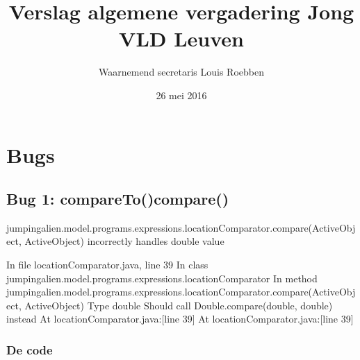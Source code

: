 \documentclass[a4paper]{article}
\begin{document}
	\title{Verslag algemene vergadering Jong VLD Leuven}
	\author{Waarnemend secretaris Louis Roebben}
	\date{26 mei 2016}
\maketitle
\section{Bugs}
\subsection{Bug 1: compareTo()compare()}
jumpingalien.model.programs.expressions.locationComparator.compare(ActiveObject, ActiveObject) incorrectly handles double value


In file locationComparator.java, line 39
In class jumpingalien.model.programs.expressions.locationComparator
In method jumpingalien.model.programs.expressions.locationComparator.compare(ActiveObject, ActiveObject)
Type double
Should call Double.compare(double, double) instead
At locationComparator.java:[line 39]
At locationComparator.java:[line 39]
\subsubsection{De code}
\end{document}
